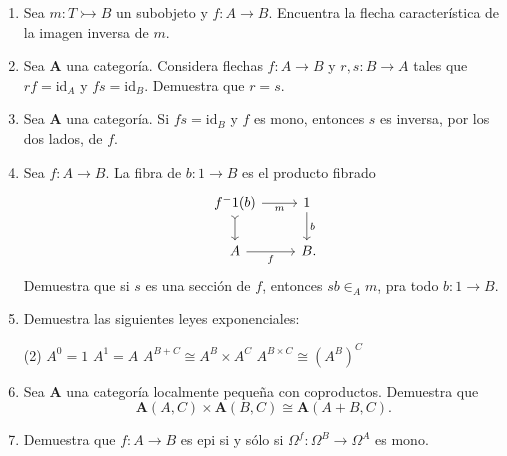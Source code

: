 \documentclass[11pt]{article}
\newcommand{\id}{\mathrm{id}}
\newcommand{\cat}[1]{\mathbf{#1}}
\begin{document}
\begin{enumerate}[\bf\text{Ej.} 1.]
    \item Sea \(m\colon T\rightarrowtail B\) un subobjeto y \(f\colon A\to B\).
    Encuentra la flecha característica de la imagen inversa de \(m\).

    \item Sea \(\cat{A}\) una categoría. Considera flechas \(f\colon A\to B\) y
    \(r,s\colon B\to A\) tales que \(rf=\id_A\) y \(fs=\id_B\). Demuestra que
    \(r=s\).

    \item Sea \(\cat{A}\) una categoría. Si \(fs=\id_B\) y \(f\) es mono,
    entonces \(s\) es inversa, por los dos lados, de \(f\).

    \item Sea \(f\colon A\to B\). La fibra de \(b\colon 1\to B\) es el producto fibrado
    \begin{equation*}
      \begin{tikzcd}
        f^-1(b)\ar{r}[swap]{m}\ar[tail]{d} & 1\ar{d}{b}\\
        A\ar{r}[swap]{f} & B\mathrlap{.}
      \end{tikzcd}
    \end{equation*}
    Demuestra que si \(s\) es una sección de \(f\), entonces \(sb\in_A m\), pra
    todo \(b\colon 1\to B\).

    \item Demuestra las siguientes leyes exponenciales:
  \begin{tasks}(2) \task \(A^0=1\) \task \(A^1=A\) \task \(A^{B+C}\cong
    A^B\times A^C\) \task \(A^{B\times C}\cong (A^B)^C\)
  \end{tasks}

  \item Sea \(\cat{A}\) una categoría localmente pequeña con coproductos. Demuestra que
  \begin{equation*}
    \cat{A}(A,C)\times\cat{A}(B,C)\cong\cat{A}(A+B,C).
  \end{equation*}

  \item Demuestra que \(f\colon A\to B\) es epi si y sólo si 
  \(\Omega^f\colon \Omega^B\to \Omega^A\) es mono.
    
  \end{enumerate}
\end{document}
